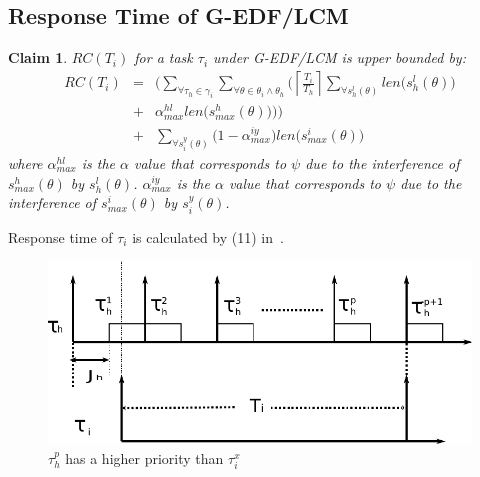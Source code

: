 \documentclass{sig-alternate}
\newtheorem{clm}{Claim}
\begin{document}
\subsection{\label{response g-edf/lcm} Response Time of G-EDF/LCM}


\begin{clm}\label{GEDF/LCM response time}
$RC(T_i)$ for a task $\tau_i$ under G-EDF/LCM is upper bounded by:
\begin{eqnarray}
RC(T_i) & = & \Bigg(\sum_{\forall \tau_h \in \gamma_i}\sum_{\forall\theta \in \theta_i \wedge \theta_h}\Bigg(\left\lceil\frac{T_{i}}{T_{h}}\right\rceil\sum_{\forall s_{h}^{l}(\theta)}len\Big(s_{h}^{l}(\theta)\Big)\nonumber\\
& + & \alpha_{max}^{hl}len\Big(s_{max}^{h}(\theta)\Big)\Bigg)\Bigg)\nonumber\\
& + & \sum_{\forall s_{i}^{y}(\theta)}\Big(1-\alpha_{max}^{iy}\Big)len\Big(s_{max}^i(\theta)\Big)  
\label{eq78}\end{eqnarray} 
where $\alpha_{max}^{hl}$ is the $\alpha$ value that corresponds to $\psi$ due to the interference of $s_{max}^h(\theta)$ by $s_h^l(\theta)$. $\alpha_{max}^{iy}$ is the $\alpha$ value that corresponds to $\psi$ due to the interference of $s_{max}^i(\theta)$ by $s_i^y(\theta)$.
\end{clm}


Response time of $\tau_{i}$ is calculated by (11) in~\cite{stmconcurrencycontrol:emsoft11}.
\begin{figure}
\begin{centering}
\includegraphics[scale=0.5]{figures/figure18}
\par\end{centering}
\caption{\label{fig17}$\tau_h^p$ has a higher priority than $\tau_i^x$}
\end{figure}
\end{document}
